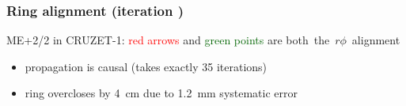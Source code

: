 \documentclass[compress]{beamer}
\begin{document}
\begin{frame}
\frametitle{Ring alignment (iteration )}

\small
\hspace{-0.5 cm} ME+2/2 in CRUZET-1: \textcolor{red}{red arrows} and \textcolor{darkgreen}{green points} are \mbox{both the $r\phi$ alignment\hspace{-1 cm}}
\begin{itemize}
\item \small propagation is causal (takes exactly 35 iterations)
\item \small ring overcloses by 4~cm due to 1.2~mm systematic error
\end{itemize}

\vspace{-0.5 cm}
\begin{center}



\end{center}
\end{frame}
\end{document}
